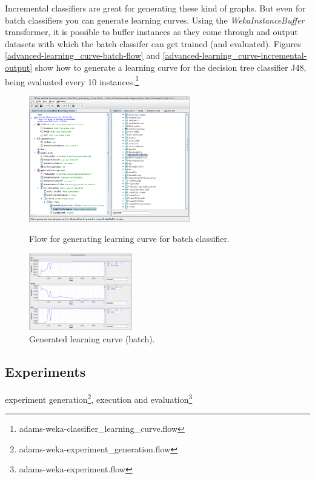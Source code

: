 Incremental classifiers are great for generating these kind of graphs. But
even for batch classifiers you can generate learning curves. Using the 
\textit{WekaInstanceBuffer} transformer, it is possible to buffer instances as
they come through and output datasets with which the batch classifer can get
trained (and evaluated). Figures \ref{advanced-learning_curve-batch-flow} and
\ref{advanced-learning_curve-incremental-output} show how to generate a 
learning curve for the decision tree classifier J48, being evaluated every
10 instances.\footnote{adams-weka-classifier\_learning\_curve.flow}

\begin{figure}[ht]
  \begin{minipage}[t]{0.55\linewidth}
    \centering
    \includegraphics[width=7.0cm]{images/advanced-learning_curve-batch-flow.png}
    \caption{Flow for generating learning curve for batch classifier.}
    \label{advanced-learning_curve-batch-flow}
  \end{minipage}
  \hspace{0.5cm}
  \begin{minipage}[t]{0.45\linewidth}
    \centering
    \includegraphics[width=4.5cm]{images/advanced-learning_curve-batch-output.png}
    \caption{Generated learning curve (batch).}
    \label{advanced-learning_curve-batch-output}
  \end{minipage}
\end{figure}

\subsection{Experiments}
experiment generation\footnote{adams-weka-experiment\_generation.flow},
execution and evaluation\footnote{adams-weka-experiment.flow}

